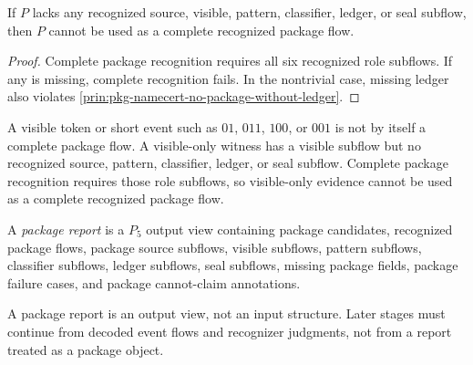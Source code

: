 \begin{theorem}
\label{thm:pkg-namecert-incomplete-package-not-package}
If $P$ lacks any recognized source, visible, pattern, classifier, ledger, or seal subflow, then $P$ cannot be used as a complete recognized package flow.
\end{theorem}

\begin{proof}
Complete package recognition requires all six recognized role subflows. If any is missing, complete recognition fails. In the nontrivial case, missing ledger also violates \autoref{prin:pkg-namecert-no-package-without-ledger}.
\end{proof}

\begin{corollary}
\label{cor:pkg-namecert-visible-token-not-package}
A visible token or short event such as $01$, $011$, $100$, or $001$ is not by itself a complete package flow. A visible-only witness has a visible subflow but no recognized source, pattern, classifier, ledger, or seal subflow. Complete package recognition requires those role subflows, so visible-only evidence cannot be used as a complete recognized package flow.
\end{corollary}

\begin{definition}
\label{def:pkg-namecert-package-report}
A \emph{package report} is a $P_5$ output view containing package candidates, recognized package flows, package source subflows, visible subflows, pattern subflows, classifier subflows, ledger subflows, seal subflows, missing package fields, package failure cases, and package cannot-claim annotations.
\end{definition}

\begin{principle}
\label{prin:pkg-namecert-package-report-output}
A package report is an output view, not an input structure. Later stages must continue from decoded event flows and recognizer judgments, not from a report treated as a package object.
\end{principle}

